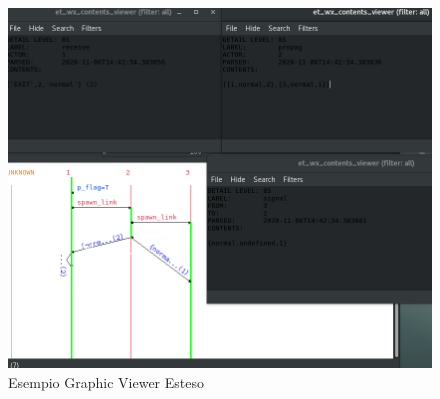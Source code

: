 \documentclass[Contributo.tex]{subfiles}
\begin{document}
	\begin{figure}[H]
		\includegraphics[scale=0.5]{./LavoroLuca/EstensioneCauder/Imgs/GraphicViewerEsteso}
		\caption{Esempio Graphic Viewer Esteso}
		\label{fig7}
	\end{figure}
\end{document}
